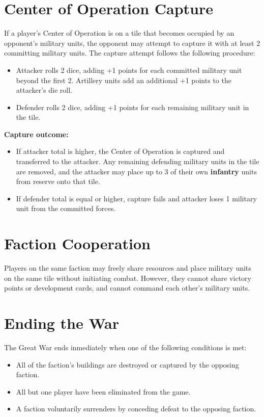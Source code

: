 \documentclass[12pt]{report}
\begin{document}
\section{Center of Operation Capture}
If a player's Center of Operation is on a tile that becomes occupied by an opponent's military units, the opponent may attempt to capture it with at least 2 committing military units. The capture attempt follows the following procedure:
\begin{itemize}[leftmargin=1.2cm]
  \item Attacker rolls 2 dice, adding +1 points for each committed military unit beyond the first 2. Artillery units add an additional +1 points to the attacker's die roll.
  \item Defender rolls 2 dice, adding +1 points for each remaining military unit in the tile.
\end{itemize}

\textbf{Capture outcome:}
\begin{itemize}[leftmargin=1.2cm]
  \item If attacker total is higher, the Center of Operation is captured and transferred to the attacker. Any remaining defending military units in the tile are removed, and the attacker may place up to 3 of their own \textbf{infantry} units from reserve onto that tile.
  \item If defender total is equal or higher, capture fails and attacker loses 1 military unit from the committed forces.
\end{itemize}

\section{Faction Cooperation}
Players on the same faction may freely share resources and place military units on the same tile without initiating combat. However, they cannot share victory points or development cards, and cannot command each other's military units.

\section{Ending the War}
The Great War ends inmediately when one of the following conditions is met:
\begin{itemize}[leftmargin=1.2cm]
  \item All of the faction's buildings are destroyed or captured by the opposing faction.
  \item All but one player have been eliminated from the game.
  \item A faction voluntarily surrenders by conceding defeat to the opposing faction.
\end{itemize}
\end{document}
